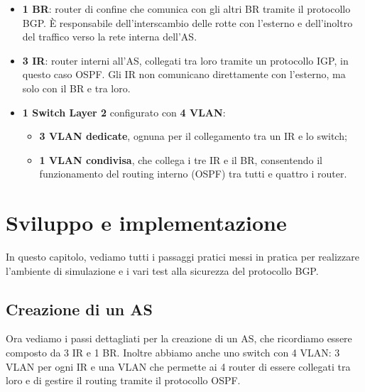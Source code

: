 \documentclass[12pt,a4paper,twoside]{book}
\begin{document}
\begin{itemize}
    \item \textbf{1 \ac{BR}}: router di confine che comunica con gli altri \ac{BR} tramite il protocollo \ac{BGP}. È responsabile dell’interscambio delle rotte con l’esterno e dell’inoltro del traffico verso la rete interna dell’\ac{AS}.
    \item \textbf{3 \ac{IR}}: router interni all’\ac{AS}, collegati tra loro tramite un protocollo \ac{IGP}, in questo caso \ac{OSPF}. Gli \ac{IR} non comunicano direttamente con l’esterno, ma solo con il \ac{BR} e tra loro.
    \item \textbf{1 Switch Layer 2} configurato con \textbf{4 VLAN}:
    \begin{itemize}
        \item \textbf{3 VLAN dedicate}, ognuna per il collegamento tra un \ac{IR} e lo switch;
        \item \textbf{1 VLAN condivisa}, che collega i tre \ac{IR} e il \ac{BR}, consentendo il funzionamento del routing interno (\ac{OSPF}) tra tutti e quattro i router.
    \end{itemize}
\end{itemize}

\chapter{Sviluppo e implementazione}
In questo capitolo, vediamo tutti i passaggi pratici messi in pratica per realizzare l'ambiente di simulazione e i vari test alla sicurezza del protocollo \ac{BGP}.

\section{Creazione di un AS}
Ora vediamo i passi dettagliati per la creazione di un \ac{AS}, che ricordiamo essere composto da 3 \ac{IR} e 1 \ac{BR}. Inoltre abbiamo anche uno switch con 4 \ac{VLAN}: 3 \ac{VLAN} per ogni \ac{IR} e una \ac{VLAN} che permette ai 4 router di essere collegati tra loro e di gestire il routing tramite il protocollo \ac{OSPF}.
\end{document}
